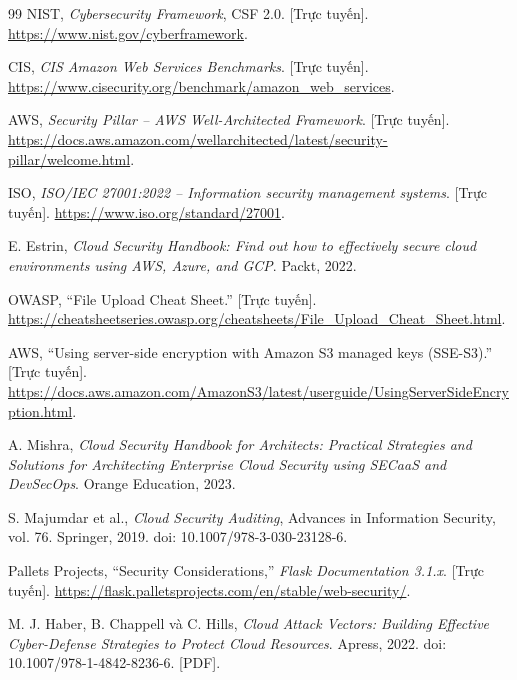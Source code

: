 \begin{thebibliography}{99}
 NIST, \textit{Cybersecurity Framework}, CSF 2.0. [Trực tuyến]. \url{https://www.nist.gov/cyberframework}.

 CIS, \textit{CIS Amazon Web Services Benchmarks}. [Trực tuyến]. \url{https://www.cisecurity.org/benchmark/amazon_web_services}.

 AWS, \textit{Security Pillar -- AWS Well-Architected Framework}. [Trực tuyến]. \url{https://docs.aws.amazon.com/wellarchitected/latest/security-pillar/welcome.html}.

 ISO, \textit{ISO/IEC 27001:2022 -- Information security management systems}. [Trực tuyến]. \url{https://www.iso.org/standard/27001}.

 E. Estrin, \textit{Cloud Security Handbook: Find out how to effectively secure cloud environments using AWS, Azure, and GCP}. Packt, 2022.

 OWASP, “File Upload Cheat Sheet.” [Trực tuyến]. \url{https://cheatsheetseries.owasp.org/cheatsheets/File_Upload_Cheat_Sheet.html}.

 AWS, “Using server-side encryption with Amazon S3 managed keys (SSE-S3).” [Trực tuyến]. \url{https://docs.aws.amazon.com/AmazonS3/latest/userguide/UsingServerSideEncryption.html}.

 A. Mishra, \textit{Cloud Security Handbook for Architects: Practical Strategies and Solutions for Architecting Enterprise Cloud Security using SECaaS and DevSecOps}. Orange Education, 2023.

 S. Majumdar et al., \textit{Cloud Security Auditing}, Advances in Information Security, vol. 76. Springer, 2019. doi: 10.1007/978-3-030-23128-6.

 Pallets Projects, “Security Considerations,” \textit{Flask Documentation 3.1.x}. [Trực tuyến]. \url{https://flask.palletsprojects.com/en/stable/web-security/}.

 M. J. Haber, B. Chappell và C. Hills, \textit{Cloud Attack Vectors: Building Effective Cyber-Defense Strategies to Protect Cloud Resources}. Apress, 2022. doi: 10.1007/978-1-4842-8236-6. [PDF].

\end{thebibliography}
\appendix
\renewcommand{\chaptername}{PHỤ LỤC}
